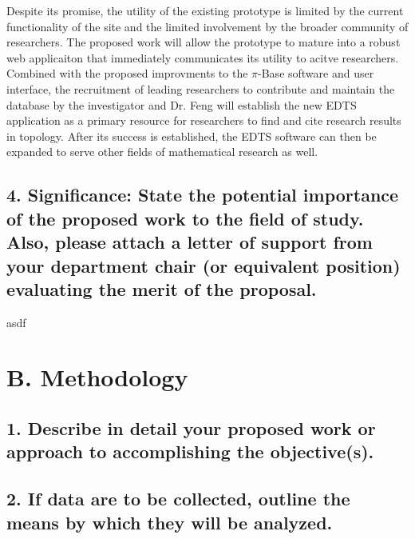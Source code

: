 \documentclass[11pt]{article}
\begin{document}
Despite its promise, the utility of the existing prototype is limited by the
current functionality of the site and the limited involvement by the broader
community of researchers. The proposed work will allow the prototype to
mature into a robust web applicaiton that immediately communicates its
utility to acitve researchers. Combined with the proposed improvments to the
\(\pi\)-Base software and user interface, the recruitment of leading
researchers to contribute and maintain the database by the investigator and
Dr. Feng will establish the new EDTS application as a primary resource for
researchers to find and cite research results in topology. After its
success is established, the EDTS software can then be expanded to serve other
fields of mathematical research as well.











\subsection*{4. Significance:  State the potential importance of the proposed work to the field of study.  Also, please attach a letter of support from your department chair (or equivalent position) evaluating the merit of the proposal.}

asdf













\section*{B. Methodology}

\subsection*{1.	Describe in detail your proposed work or approach to accomplishing the objective(s).}















\subsection*{2. If data are to be collected, outline the means by which they will be analyzed.}
\end{document}
